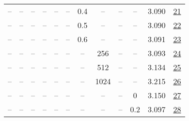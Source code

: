 \begin{table}[H]
\begin{tabular}{cccccccccccc}
-- & -- & -- & -- & -- & -- & 0.4 & -- & -- & -- & 3.090 & \href{https://wandb.ai/stanford-mercury/optimizer-scaling/runs/sweep-520m-10B-scion52ef41lr0.008-wd0.1-minlr0-warmup0-b10.98-gn-3e355e}{21} \\
-- & -- & -- & -- & -- & -- & 0.5 & -- & -- & -- & 3.090 & \href{https://wandb.ai/stanford-mercury/optimizer-scaling/runs/sweep-520m-10B-scion42bbdflr0.008-wd0.1-minlr0-warmup0-b10.98-gn-a79196}{22} \\
-- & -- & -- & -- & -- & -- & 0.6 & -- & -- & -- & 3.091 & \href{https://wandb.ai/stanford-mercury/optimizer-scaling/runs/sweep-520m-10B-scion1a0f9alr0.008-wd0.1-minlr0-warmup0-b10.98-gn-6eb8c4}{23} \\
-- & -- & -- & -- & -- & -- & -- & 256 & -- & -- & 3.093 & \href{https://wandb.ai/stanford-mercury/optimizer-scaling/runs/sweep-520m-10B-scion277435lr0.008-wd0.1-minlr0-warmup0-b10.98-gn-77a9f9}{24} \\
-- & -- & -- & -- & -- & -- & -- & 512 & -- & -- & 3.134 & \href{https://wandb.ai/stanford-mercury/optimizer-scaling/runs/sweep-520m-10B-scion78b03blr0.008-wd0.1-minlr0-warmup0-b10.98-gn-9b50fe}{25} \\
-- & -- & -- & -- & -- & -- & -- & 1024 & -- & -- & 3.215 & \href{https://wandb.ai/stanford-mercury/optimizer-scaling/runs/sweep-520m-10B-scion3c3da1lr0.008-wd0.1-minlr0-warmup0-b10.98-gn-e9fde3}{26} \\
-- & -- & -- & -- & -- & -- & -- & -- & -- & 0 & 3.150 & \href{https://wandb.ai/stanford-mercury/optimizer-scaling/runs/sweep-520m-10B-scion042572lr0.008-wd0-minlr0-warmup0-b10.98-gn2--bcd543}{27} \\
-- & -- & -- & -- & -- & -- & -- & -- & -- & 0.2 & 3.097 & \href{https://wandb.ai/stanford-mercury/optimizer-scaling/runs/sweep-520m-10B-scion697aa0lr0.008-wd0.2-minlr0-warmup0-b10.98-gn-dd38aa}{28} \\
\bottomrule
\end{tabular}
\end{table}

